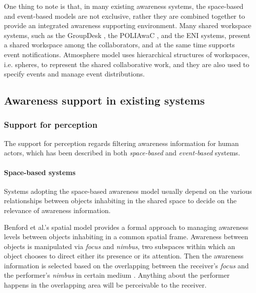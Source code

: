 One thing to note is that, in many existing awareness systems, the space-based and event-based models are not exclusive, rather they are combined together to provide an integrated awareness supporting environment. Many shared workspace systems, such as the GroupDesk \cite{Fuchs1995}, the POLIAwaC \cite{sohlenkamp2000po}, and the ENI \cite{Gross2004} systems, present a shared workspace among the collaborators, and at the same time supports event notifications. Atmosphere model \cite{Rittenbruch2002} uses hierarchical structures of workspaces, i.e. spheres, to represent the shared collaborative work, and they are also used to specify events and manage event distributions.

\subsection{Awareness support in existing systems} %
\label{sub:awareness_support_in_existing_systems}

\subsubsection{Support for perception} %
\label{ssub:support_for_perception}
The support for perception regards filtering awareness information for human actors, which has been described in both \emph{space-based} and \emph{event-based} systems.

\paragraph*{Space-based systems} %
\label{par:space_based_systems}
Systems adopting the space-based awareness model usually depend on the various relationships between objects inhabiting in the shared space to decide on the relevance of awareness information.

Benford et al.'s spatial model \cite{Benford1993} provides a formal approach to managing awareness levels between objects inhabiting in a common spatial frame. Awareness between objects is manipulated via \emph{focus} and \emph{nimbus}, two subspaces within which an object chooses to direct either its presence or its attention. Then the awareness information is selected based on the overlapping between the receiver's \emph{focus} and the performer's \emph{nimbus} in certain medium \cite{Benford1993}. Anything about the performer happens in the overlapping area will be perceivable to the receiver. 

